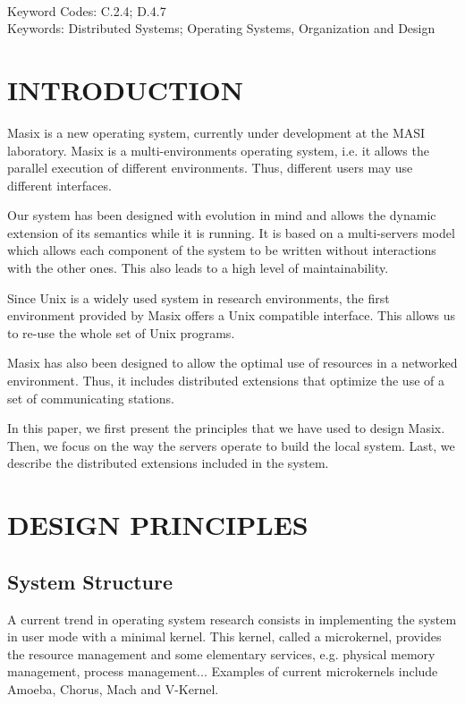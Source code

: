~\\
Keyword Codes: C.2.4; D.4.7 \\
Keywords: Distributed Systems; Operating Systems, Organization and Design

\section* {INTRODUCTION}

	Masix\cite {masix:osf} is a new operating system, currently under development at the
MASI laboratory. Masix is a multi-environments operating system, i.e. it allows
the parallel execution of different environments. Thus, different users may
use different interfaces.

	Our system has been designed with evolution in mind and allows the
dynamic extension of its semantics while it is running. It is based on a
multi-servers model which allows each component of the system to be written
without interactions with the other ones. This also leads to a high level
of maintainability.

	Since Unix is a widely used system in research environments, the first
environment provided by Masix
offers a Unix compatible interface. This allows us to re-use the whole
set of Unix programs.

	Masix has also been designed to allow the optimal use of resources
in a networked environment. Thus, it includes distributed extensions that
optimize the use of a set of communicating stations.

	In this paper, we first present the principles that we have used to
design Masix. Then, we focus on the way the servers operate to build
the local system. Last, we describe the distributed extensions included in
the system.

\section {DESIGN PRINCIPLES}

\subsection {System Structure}

%
	A current trend in operating system research consists in implementing
the system in user mode with a minimal kernel. This kernel, called a
microkernel, provides the resource management and some elementary services,
e.g. physical memory management, process management... Examples of current
microkernels include Amoeba\cite {mullender:amoeba},
Chorus\cite {rozier:chorus:overview}, Mach\cite {mach:foundation} and
V-Kernel\cite {cheriton:v}.

